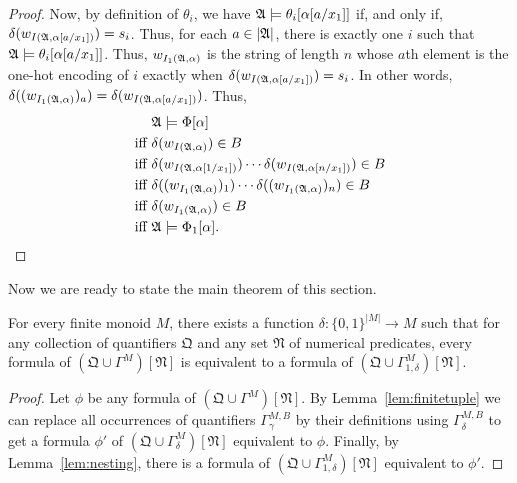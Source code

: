 \documentclass[a4paper,UKenglish,cleveref, autoref, thm-restate, anonymous]{lipics-v2021}
\begin{document}
\begin{proof}
      Now, by definition of $\theta_i$, we have $\mathfrak{A} \models \theta_i[\alpha[a/x_1]]$ if, and only if, $\delta(w_{I(\mathfrak{A},\alpha[a/x_1])}) = s_i$.  Thus, for each $a \in |\mathfrak{A}|$, there is exactly one $i$ such that  $\mathfrak{A} \models \theta_i[\alpha[a/x_1]]$.  Thus, 
      $w_{I_1(\mathfrak{A},\alpha)}$ is the string of length $n$ whose  $a$th element is the one-hot encoding of $i$ exactly when $\delta(w_{I(\mathfrak{A},\alpha[a/x_1])}) = s_i$.  In other words, $\delta((w_{I_1(\mathfrak{A},\alpha)})_a) = \delta(w_{I(\mathfrak{A},\alpha[a/x_1])})$.
      Thus,
    \begin{align*}
        & \mathfrak{A} \models \Phi[\alpha] \\
        \text{iff}\ & \delta(w_{I(\mathfrak{A},\alpha)}) \in B \\
        \text{iff}\ & \delta(w_{I(\mathfrak{A},\alpha[1/x_1])})\cdots \delta(w_{I(\mathfrak{A},\alpha[n/x_1])}) \in B \\
        \text{iff}\ & \delta((w_{I_1(\mathfrak{A},\alpha)})_1)\cdots \delta((w_{I_1(\mathfrak{A},\alpha)})_n) \in B \\
        \text{iff}\ & \delta(w_{I_1(\mathfrak{A},\alpha)}) \in B \\
        \text{iff}\ & \mathfrak{A} \models \Phi_1[\alpha].
    \end{align*}

    \end{proof}

    Now we are ready to state the main theorem of this section.
    \begin{theorem}\label{thm:finitebinding}
         For every finite monoid $M$, there exists a function $\delta : \{0,1\}^{|M|} \rightarrow M$ such that for any collection of quantifiers $\mathfrak{Q}$ and any set $\mathfrak{N}$ of numerical predicates, every formula of $(\mathfrak{Q} \cup \Gamma^M)[\mathfrak{N}]$ is equivalent to a formula of $(\mathfrak{Q} \cup \Gamma^M_{1,\delta})[\mathfrak{N}]$.
   \end{theorem}
   \begin{proof}
     Let $\phi$ be any formula of $(\mathfrak{Q}  \cup \Gamma^M)[\mathfrak{N}]$.  By Lemma~\ref{lem:finitetuple} we can replace all occurrences of quantifiers $\Gamma^{M,B}_{\gamma}$ by their definitions using $\Gamma^{M,B}_{\delta}$ to get a  formula $\phi'$ of $(\mathfrak{Q}  \cup \Gamma^M_{\delta})[\mathfrak{N}]$ equivalent to $\phi$.  Finally, by Lemma~\ref{lem:nesting}, there is a formula of $(\mathfrak{Q}  \cup \Gamma^M_{1,\delta})[\mathfrak{N}]$ equivalent to $\phi'$.
\end{proof}
\end{document}
